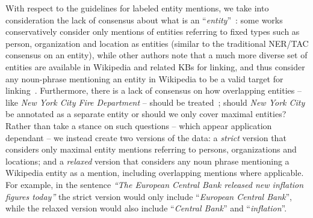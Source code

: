 \documentclass{llncs}
\begin{document}
With respect to the guidelines for labeled entity mentions, we take into consideration the lack of consensus about what is an ``\textit{entity}''~\cite{usa_Gerbil_jha2017all,LingSW15}: some works conservatively consider only mentions of entities referring to fixed types such as person, organization and location as entities (similar to the traditional NER/TAC consensus on an entity), while other authors note that a much more diverse set of entities are available in Wikipedia and related KBs for linking, and thus consider any noun-phrase mentioning an entity in Wikipedia to be a valid target for linking~\cite{PereraMAST16}. Furthermore, there is a lack of consensus on how overlapping entities -- like \textit{New York City Fire Department} -- should be treated~\cite{usa_Gerbil_jha2017all,LingSW15}; should \textit{New York City} be annotated as a separate entity or should we only cover maximal entities? Rather than take a stance on such questions -- which appear application dependant -- we instead create two versions of the data: a \textit{strict} version that considers only maximal entity mentions referring to persons, organizations and locations; and a \textit{relaxed} version that considers any noun phrase mentioning a Wikipedia entity as a mention, including overlapping mentions where applicable. For example, in the sentence \textit{``The European Central Bank released new inflation figures today''} the strict version would only include ``\textit{European Central Bank}'', while the relaxed version would also include ``\textit{Central Bank}'' and ``\textit{inflation}''.

\end{document}
